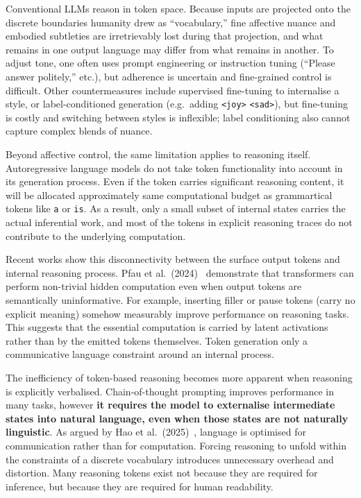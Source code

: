 \documentclass[12pt,twoside]{report}
\begin{document}
Conventional LLMs reason in token space. Because inputs are projected onto the discrete boundaries humanity drew as ``vocabulary,'' fine affective nuance and embodied subtleties are irretrievably lost during that projection, and what remains in one output language may differ from what remains in another. To adjust tone, one often uses prompt engineering or instruction tuning (``Please answer politely,'' etc.), but adherence is uncertain and fine-grained control is difficult. Other countermeasures include supervised fine-tuning to internalise a style, or label-conditioned generation (e.g.\, adding \texttt{<joy>} \texttt{<sad>}), but fine-tuning is costly and switching between styles is inflexible; label conditioning also cannot capture complex blends of nuance.

Beyond affective control, the same limitation applies to reasoning itself. Autoregressive language models do not take token functionality into account in its generation process. Even if the token carries significant reasoning content, it will be allocated approximately same computational budget as grammartical tokens like \texttt{a} or \texttt{is}. As a result, only a small subset of internal states carries the actual inferential work, and most of the tokens in explicit reasoning traces do not contribute to the underlying computation.

Recent works show this disconnectivity between the surface output tokens and internal reasoning process. Pfau et al.\ (2024)~\cite{pfau2024lets} demonstrate that transformers can perform non-trivial hidden computation even when output tokens are semantically uninformative. For example, inserting filler or pause tokens (carry no explicit meaning) somehow measurably improve performance on reasoning tasks. This suggests that the essential computation is carried by latent activations rather than by the emitted tokens themselves. Token generation only a communicative language constraint around an internal process.

The inefficiency of token-based reasoning becomes more apparent when reasoning is explicitly verbalised. Chain-of-thought prompting improves performance in many tasks, however \textbf{it requires the model to externalise intermediate states into natural language, even when those states are not naturally linguistic}. As argued by Hao et al.\ (2025)~\cite{hao2025traininglargelanguagemodels}, language is optimised for communication rather than for computation. Forcing reasoning to unfold within the constraints of a discrete vocabulary introduces unnecessary overhead and distortion. Many reasoning tokens exist not because they are required for inference, but because they are required for human readability.
\end{document}
